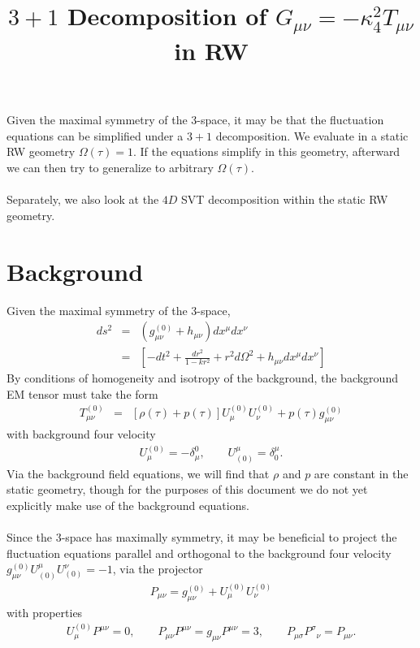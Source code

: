 \documentclass[10pt,letterpaper]{article}
\title{$3+1$ Decomposition of $ G_{\mu\nu}=-\kappa^2_4 T_{\mu\nu}$ in RW}
\date{}
\numberwithin{equation}{section}
\begin{document}
 
\maketitle
\noindent 

Given the maximal symmetry of the 3-space, it may be that the fluctuation equations can be simplified under a $3+1$ decomposition. We evaluate in a static RW geometry $\Omega(\tau)=1$. If the equations simplify in this geometry, afterward we can then try to generalize to arbitrary $\Omega(\tau)$. 
\\ \\
Separately, we also look at the $4D$ SVT decomposition within the static RW geometry. 
\section{Background}
%
Given the maximal symmetry of the 3-space, 
\begin{eqnarray}
ds^2 &=&(g_{\mu\nu}^{(0)} + h_{\mu\nu})dx^\mu dx^\nu
\nonumber\\
&=& \left[ -dt^2 + \frac{dr^2}{1-kr^2} + r^2d\Omega^2 + h_{\mu\nu}dx^\mu dx^\nu\right]
\label{geom}
\end{eqnarray}
By conditions of homogeneity and isotropy of the background, the background EM tensor must take the form
\begin{eqnarray}
T_{\mu\nu}^{(0)} &=& [\rho(\tau)+p(\tau)]U^{(0)}_\mu U^{(0)}_\nu + p(\tau)g_{\mu\nu}^{(0)}
\label{perfectfluid}
\end{eqnarray}
with background four velocity
\begin{eqnarray}
U_\mu^{(0)} = -\delta^0_\mu,\qquad U^\mu_{(0)} = \delta_0^\mu.
\end{eqnarray}
Via the background field equations, we will find that $\rho$ and $p$ are constant in the static geometry, though for the purposes of this document we do not yet explicitly make use of the background equations.
\\ \\
Since the 3-space has maximally symmetry, it may be beneficial to project the fluctuation equations parallel and orthogonal to the background four velocity $g_{\mu\nu}^{(0)}U_{(0)}^\mu U_{(0)}^\nu = -1$, via the projector
\begin{eqnarray}
P_{\mu\nu} = g_{\mu\nu}^{(0)} + U_\mu^{(0)} U_\nu^{(0)}
\label{proj}
\end{eqnarray}
with properties
\begin{eqnarray}
U_\mu^{(0)} P^{\mu\nu} = 0,\qquad P_{\mu\nu}P^{\mu\nu} = g_{\mu\nu} P^{\mu\nu}=3,\qquad P_{\mu\sigma}P^\sigma{}_\nu = P_{\mu\nu}. 
\end{eqnarray}
\end{document}
